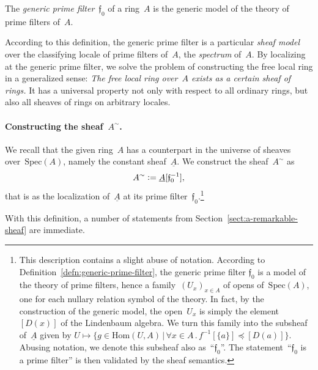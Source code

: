 \documentclass{ws-rv9x6}
\newcommand{\fff}{\mathfrak{f}}
\newcommand{\defeq}{\vcentcolon=}
\newcommand{\Hom}{\mathrm{Hom}}
\newcommand{\Spec}{\mathrm{Spec}}
\renewcommand{\_}{\mathpunct{.}}
\newcommand{\?}{\,{:}\,}
\begin{document}
\begin{definition}\label{defn:generic-prime-filter}
The \emph{generic prime filter}~$\fff_0$ of a ring~$A$ is the
generic model of the theory of prime filters of~$A$.\end{definition}

According to this definition, the generic prime filter is a particular
\emph{sheaf model} over the classifying locale of prime filters of~$A$, the
\emph{spectrum} of~$A$. By localizing at the generic prime filter, we solve
the problem of constructing the free local ring in a generalized sense: \emph{The
free local ring over~$A$ exists as a certain sheaf of rings.} It has a
universal property not only with respect to all ordinary rings, but also all
sheaves of rings on arbitrary locales.

\paragraph{Constructing the sheaf~$A^\sim$.} We recall that the given ring~$A$
has a counterpart in the universe of sheaves over~$\Spec(A)$, namely the
constant sheaf~$\underline{A}$. We construct the sheaf~$A^\sim$ as
\[ A^\sim \defeq \underline{A}[\fff_0^{-1}], \]
that is as the localization of~$\underline{A}$ at its prime
filter~$\fff_0$.\footnote{This description contains a slight abuse of notation.
According to Definition~\ref{defn:generic-prime-filter}, the generic prime
filter $\fff_0$ is a model of the theory of prime filters, hence a
family~$(U_x)_{x \in A}$ of opens of~$\Spec(A)$, one for each nullary relation
symbol of the theory. In fact, by the construction of the generic model, the
open~$U_x$ is simply the element~$[D(x)]$ of the Lindenbaum algebra. We
turn this family into the subsheaf of~$\underline{A}$ given by $U \mapsto \{ g
\in \Hom(U,A) \,|\, \forall x \in A\_ f^{-1}[\{a\}] \preceq [D(a)] \}$. Abusing
notation, we denote this subsheaf also as~``$\fff_0$''. The
statement~``$\fff_0$ is a prime filter'' is then validated by the sheaf semantics.}

With this definition, a number of statements from
Section~\ref{sect:a-remarkable-sheaf} are immediate.
\end{document}
